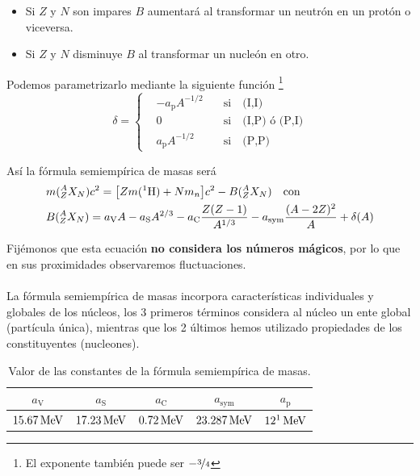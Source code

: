 \begin{itemize}
\begin{itemize}
        \item Si $Z$ y $N$ son impares $B$ aumentará al transformar un neutrón en un protón o viceversa.
        \item Si $Z$ y $N$ disminuye $B$ al transformar un nucleón en otro.
    \end{itemize}
    Podemos parametrizarlo mediante la siguiente función \footnote{El exponente también puede ser $-\nicefrac{3}{4}$}
    \begin{equation}
        \delta = \left \{ \begin{aligned}
            &- a_\mathrm{p}A^{-1/2}  & \quad \text{si} \quad \text{(I,I)}\\
            &0 & \quad \text{si} \quad \text{(I,P) ó (P,I)} \\
            & a_\mathrm{p}A^{-1/2} & \quad \text{si} \quad \text{(P,P)}
        \end{aligned} \right.
    \end{equation}
    \label{eq: termino de pairing}
\end{itemize} 

Así la fórmula semiempírica de masas será
\begin{equation}
    \begin{aligned}
        &m(^A_Z X_N)c^2=\qty[Z m(^1\mathrm{H})+Nm_n]c^2-B(^A_Z X_N) \quad \mathrm{con} \\
        &B(^A_Z X_N)=a_\mathrm{V}A-a_\mathrm{S}A^{2/3}-a_\mathrm{C}\frac{Z(Z-1)}{A^{1/3}}-a_\mathrm{sym} \frac{(A-2Z)^2}{A}+\delta(A)
    \end{aligned}
    \label{eq: formulas semiempirica de masas}
\end{equation}


Fijémonos que esta ecuación \textbf{no considera los números mágicos}, por lo que en sus proximidades observaremos fluctuaciones.\\\\
La fórmula semiempírica de masas incorpora características individuales y globales de los núcleos, los 3 primeros términos considera al núcleo un ente global (partícula única), mientras que los 2 últimos hemos utilizado propiedades de los constituyentes (nucleones).

\begin{table}[h]
\centering
\begin{tabular}{|ccccc|}
\hline
\multicolumn{1}{|c|}{$a_\mathrm{V}$} &
  \multicolumn{1}{c|}{$a_\mathrm{S}$} &
  \multicolumn{1}{c|}{$a_\mathrm{C}$} &
  \multicolumn{1}{c|}{$a_\mathrm{sym}$} &
  $a_\mathrm{p}$ \\ \hline \hline
$\unit[15.67]{MeV}$ &
  $\unit[17.23]{MeV}$ &
  $\unit[0.72]{MeV}$ &
  $\unit[23.287]{MeV}$ &
  $\unit[12 \footnotemark]{MeV}$ \\ \hline
\end{tabular}
\caption{Valor de las constantes de la fórmula semiempírica de masas.}
\label{tab: constantes de Formula semiempirica de masas}
\end{table}
